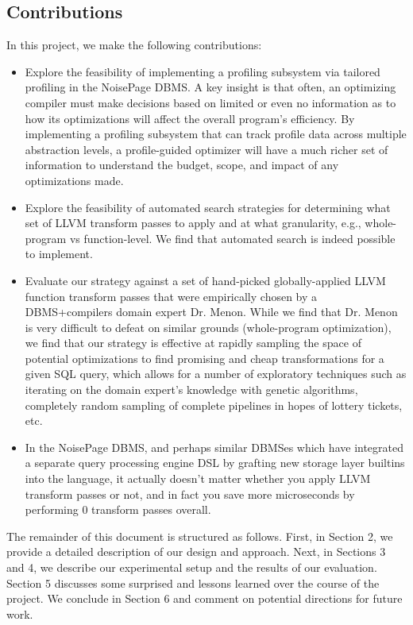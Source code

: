 \documentclass{vldb}
\begin{document}
\subsection{Contributions}

In this project, we make the following contributions:

\begin{itemize}
    \item Explore the feasibility of implementing a profiling subsystem via tailored profiling \cite{beischl21} in the NoisePage DBMS. A key insight is that often, an optimizing compiler must make decisions based on limited or even no information as to how its optimizations will affect the overall program’s efficiency. By implementing a profiling subsystem that can track profile data across multiple abstraction levels, a profile-guided optimizer will have a much richer set of information to understand the budget, scope, and impact of any optimizations made. 
    \item Explore the feasibility of automated search strategies for determining what set of LLVM transform passes to apply and at what granularity, e.g., whole-program vs function-level. We find that automated search is indeed possible to implement.
    \item Evaluate our strategy against a set of hand-picked globally-applied LLVM function transform passes that were empirically chosen by a DBMS+compilers domain expert Dr. Menon. While we find that Dr. Menon is very difficult to defeat on similar grounds (whole-program optimization), we find that our strategy is effective at rapidly sampling the space of potential optimizations to find promising and cheap transformations for a given SQL query, which allows for a number of exploratory techniques such as iterating on the domain expert's knowledge with genetic algorithms, completely random sampling of complete pipelines in hopes of lottery tickets, etc.
    \item In the NoisePage DBMS, and perhaps similar DBMSes which have integrated a separate query processing engine DSL by grafting new storage layer builtins into the language, it actually doesn't matter whether you apply LLVM transform passes or not, and in fact you save more microseconds by performing 0 transform passes overall.
\end{itemize}

The remainder of this document is structured as follows. First, in Section 2, we provide a detailed description of our design and approach. Next, in Sections 3 and 4, we describe our experimental setup and the results of our evaluation. Section 5 discusses some surprised and lessons learned over the course of the project. We conclude in Section 6 and comment on potential directions for future work.
\end{document}
